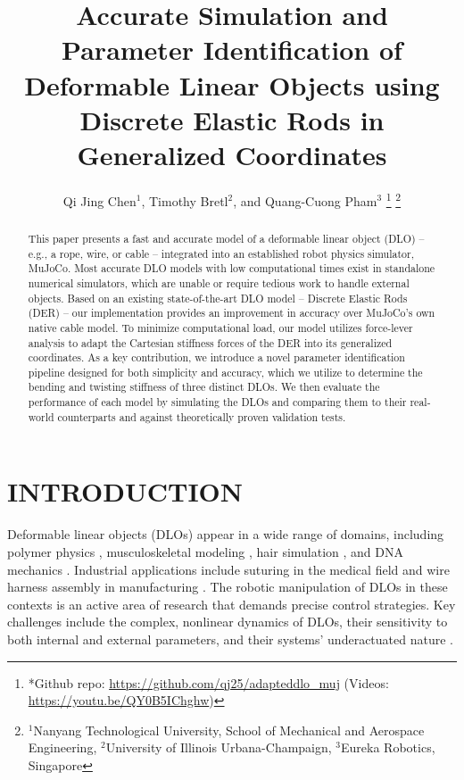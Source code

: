 \documentclass[letterpaper, 10 pt, conference]{ieeeconf}  %
\title{\LARGE \bf
Accurate Simulation and Parameter Identification of Deformable Linear Objects using Discrete Elastic Rods in Generalized Coordinates
}
\author{Qi Jing Chen$^{1}$, Timothy Bretl$^{2}$, and Quang-Cuong Pham$^{3}$%
\thanks{*Github repo: \url{https://github.com/qj25/adapteddlo_muj} (Videos: \url{https://youtu.be/QY0B5IChghw})}%
\thanks{$^{1}$Nanyang Technological University, School of Mechanical and Aerospace Engineering, $^{2}$University of Illinois Urbana-Champaign,
$^{3}$Eureka Robotics, Singapore
	}%
}
\begin{document}
\maketitle

\begin{abstract}
	
This paper presents a fast and accurate model of a deformable linear object (DLO) -- e.g., a rope, wire, or cable -- integrated into an established robot physics simulator, MuJoCo. Most accurate DLO models with low computational times exist in standalone numerical simulators, which are unable or require tedious work to handle external objects. Based on an existing state-of-the-art DLO model -- Discrete Elastic Rods (DER) -- our implementation provides an improvement in accuracy over MuJoCo's own native cable model. To minimize computational load, our model utilizes force-lever analysis to adapt the Cartesian stiffness forces of the DER into its generalized coordinates. As a key contribution, we introduce a novel parameter identification pipeline designed for both simplicity and accuracy, which we utilize to determine the bending and twisting stiffness of three distinct DLOs. We then evaluate the performance of each model by simulating the DLOs and comparing them to their real-world counterparts and against theoretically proven validation tests.

\end{abstract}



\section{INTRODUCTION}
Deformable linear objects (DLOs) appear in a wide range of domains, including polymer physics \cite{wiggins2005exact}, musculoskeletal modeling \cite{zhang2019modeling}, hair simulation \cite{bertails2006super}, and DNA mechanics \cite{sereda2010evaluation}. Industrial applications include suturing in the medical field \cite{joglekar2024autonomous} and wire harness assembly in manufacturing \cite{zhou2020practical}. The robotic manipulation of DLOs in these contexts is an active area of research that demands precise control strategies. Key challenges include the complex, nonlinear dynamics of DLOs, their sensitivity to both internal and external parameters, and their systems' underactuated nature \cite{zhu2021challenges}.
\end{document}

